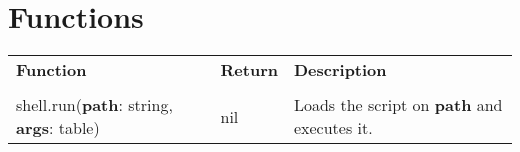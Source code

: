 

\section{Functions}

\begin{tabularx}{\textwidth}{l l X}
	\textbf{\large Function} & \textbf{\large Return} & \textbf{\large Description}
	\\ \\
	\endhead
	shell.run(\textbf{path}: string, \textbf{args}: table) & nil & Loads the script on \textbf{path} and executes it.
\end{tabularx}